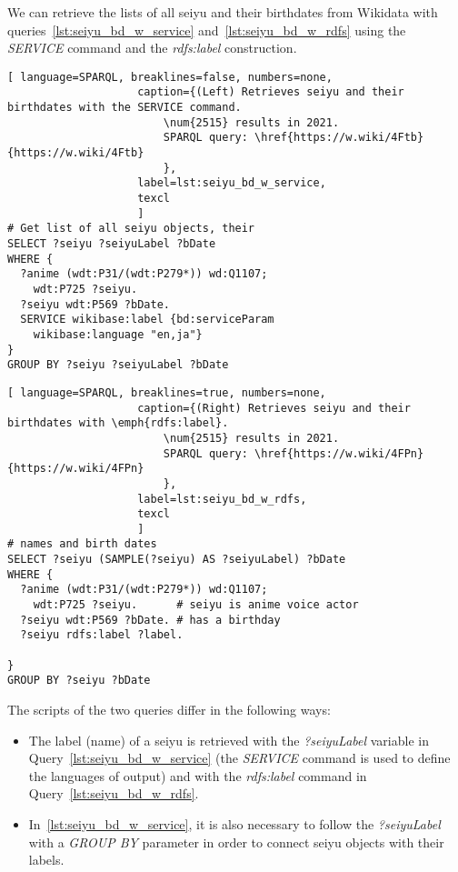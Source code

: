 We can retrieve the lists of all seiyu and their birthdates from Wikidata with queries~\ref{lst:seiyu_bd_w_service} and~\ref{lst:seiyu_bd_w_rdfs} using the \emph{SERVICE} command and the \emph{rdfs:label} construction.

\begin{widepar}%
%
\noindent\begin{minipage}[]{.43\linewidth}
    \captionsetup[lstlisting]{format=llapwide11lines}%
\begin{lstlisting}[ language=SPARQL, breaklines=false, numbers=none,
                    caption={(Left) Retrieves seiyu and their birthdates with the SERVICE command.
                        \num{2515} results in 2021.
                        SPARQL query: \href{https://w.wiki/4Ftb}{https://w.wiki/4Ftb}
                        },
                    label=lst:seiyu_bd_w_service,
                    texcl 
                    ]
# Get list of all seiyu objects, their 
SELECT ?seiyu ?seiyuLabel ?bDate
WHERE {
  ?anime (wdt:P31/(wdt:P279*)) wd:Q1107;
    wdt:P725 ?seiyu.       
  ?seiyu wdt:P569 ?bDate. 
  SERVICE wikibase:label {bd:serviceParam 
    wikibase:language "en,ja"}
}
GROUP BY ?seiyu ?seiyuLabel ?bDate
\end{lstlisting}%
\end{minipage}%
\begin{minipage}[]{.55\linewidth}
    \captionsetup[lstlisting]{format=llapwide15lines}%
\begin{lstlisting}[ language=SPARQL, breaklines=true, numbers=none,
                    caption={(Right) Retrieves seiyu and their birthdates with \emph{rdfs:label}.
                        \num{2515} results in 2021.
                        SPARQL query: \href{https://w.wiki/4FPn}{https://w.wiki/4FPn}
                        },
                    label=lst:seiyu_bd_w_rdfs,
                    texcl 
                    ]
# names and birth dates
SELECT ?seiyu (SAMPLE(?seiyu) AS ?seiyuLabel) ?bDate
WHERE {
  ?anime (wdt:P31/(wdt:P279*)) wd:Q1107;
    wdt:P725 ?seiyu.      # seiyu is anime voice actor
  ?seiyu wdt:P569 ?bDate. # has a birthday 
  ?seiyu rdfs:label ?label.

}
GROUP BY ?seiyu ?bDate
\end{lstlisting}%
\end{minipage}
\end{widepar}%

The scripts of the two queries differ in the following ways:
\begin{itemize}
    \item{The label (name) of a seiyu is retrieved with the \emph{?seiyuLabel} variable in Query~\ref{lst:seiyu_bd_w_service} (the \emph{SERVICE} command is used to define the languages of output) and with the \emph{rdfs:label} command in Query~\ref{lst:seiyu_bd_w_rdfs}.}
    \item{In~\ref{lst:seiyu_bd_w_service}, it is also necessary to follow the \emph{?seiyuLabel} with a \emph{GROUP BY} parameter in order to connect seiyu objects with their labels.}
\end{itemize}


